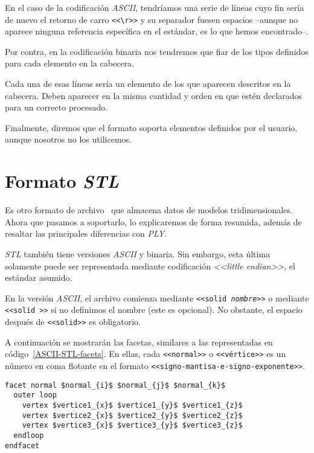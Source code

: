 En el caso de la codificación \textit{ASCII}, tendríamos una serie de líneas cuyo fin sería de nuevo el retorno de carro \texttt{<<\textbackslash r>>} y su separador fuesen espacios --aunque no aparece ninguna referencia específica en el estándar, es lo que hemos encontrado--. 

Por contra, en la codificación binaria nos tendremos que fiar de los tipos definidos para cada elemento en la cabecera.

Cada una de esas líneas sería un elemento de los que aparecen descritos en la cabecera. Deben aparecer en la misma cantidad y orden en que estén declarados para un correcto procesado.

Finalmente, diremos que el formato soporta elementos definidos por el usuario, aunque nosotros no los utilicemos.

\section{Formato \textit{STL}}
Es otro formato de archivo~\cite{wiki:STL} que almacena datos de modelos tridimensionales. Ahora que pasamos a soportarlo, lo explicaremos de forma resumida, además de resaltar las principales diferencias con \textit{PLY}.

\textit{STL} también tiene versiones \textit{ASCII} y binaria. Sin embargo, esta última solamente puede ser representada mediante codificación \textit{<<little endian>>}, el estándar asumido.

En la versión \textit{ASCII}, el archivo comienza mediante \texttt{<<solid \textit{nombre}>>} o mediante \texttt{<<solid >>} si no definimos el nombre (este es opcional). No obstante, el espacio después de \texttt{<<solid>>} es obligatorio.

A continuación se mostrarán las facetas, similares a las representadas en código~\ref{ASCII-STL-facets}. En ellas, cada \texttt{<<normal>>} o \texttt{<<vértice>>} es un número en coma flotante en el formato \texttt{<<signo-mantisa-e-signo-exponente>>}.

\begin{lstlisting}[mathescape=true, frame=single, float, caption=Facetas en \textit{ASCII STL}, label=ASCII-STL-facets]
facet normal $normal_{i}$ $normal_{j}$ $normal_{k}$
  outer loop
    vertex $vertice1_{x}$ $vertice1_{y}$ $vertice1_{z}$
    vertex $vertice2_{x}$ $vertice2_{y}$ $vertice2_{z}$
    vertex $vertice3_{x}$ $vertice3_{y}$ $vertice3_{z}$
  endloop
endfacet
\end{lstlisting}

